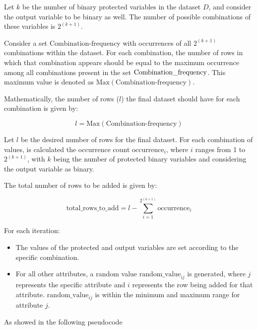 Let \( k \) be the number of binary protected variables in the dataset \( D \), and consider the output variable to be binary as well. The number of possible combinations of these variables is \( 2^{(k+1)} \).

Consider a set \( \text{Combination-frequency} \) with occurrences of all \( 2^{(k+1)} \) combinations within the dataset. For each combination, the number of rows in which that combination appears should be equal to the maximum occurrence among all combinations present in the set \( \text{Combination\textunderscore frequency} \). This maximum value is denoted as \( \text{Max}(\text{Combination-frequency}) \).

Mathematically, the number of rows (\( l \)) the final dataset should have for each combination is given by:

\[
l = \text{Max}(\text{Combination-frequency})
\]



Let \( l \) be the desired number of rows for the final dataset. For each combination of values, is calculated the occurrence count \( \text{occurrence}_i \), where \( i \) ranges from 1 to \( 2^{(k+1)} \), with \( k \) being the number of protected binary variables and considering the output variable as binary.

The total number of rows to be added is given by:

\[
\text{total\_rows\_to\_add} = l - \sum_{i=1}^{2^{(k+1)}} \text{occurrence}_i
\]

For each iteration:

\begin{itemize}

    \item The values of the protected and output variables are set according to the specific combination.
    
    \item For all other attributes, a random value \( \text{random\_value}_{ij} \) is generated, where \( j \) represents the specific attribute and \( i \) represents the row being added for that attribute. \( \text{random\_value}_{ij} \) is within the minimum and maximum range for attribute \( j \).

\end{itemize}

As showed in the following pseudocode

